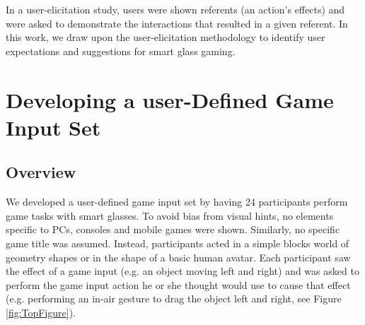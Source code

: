 \documentclass{sigchi}
\begin{document}
    In a user-elicitation study, users were shown referents (an action's effects) and were asked to demonstrate the interactions that resulted in a given referent\cite{Wobbrock:2009:UGS:1518701.1518866}. In this work, we draw upon the user-elicitation methodology to identify user expectations and suggestions for smart glass gaming.


\section{Developing a user-Defined Game Input Set}


    \subsection {Overview}


    We developed a user-defined game input set by having 24 participants perform game tasks with smart glasses. To avoid bias from visual hints\cite{Epps:2006:SHS:1125451.1125601}, no elements specific to PCs, consoles and mobile games were shown. Similarly, no specific game title was assumed. Instead, participants acted in a simple blocks world of geometry shapes or in the shape of a basic human avatar. Each participant saw the effect of a game input (e.g. an object moving left and right) and was asked to perform the game input action he or she thought would use to cause that effect (e.g. performing an in-air gesture to drag the object left and right, see Figure \ref{fig:TopFigure}). 
\end{document}
